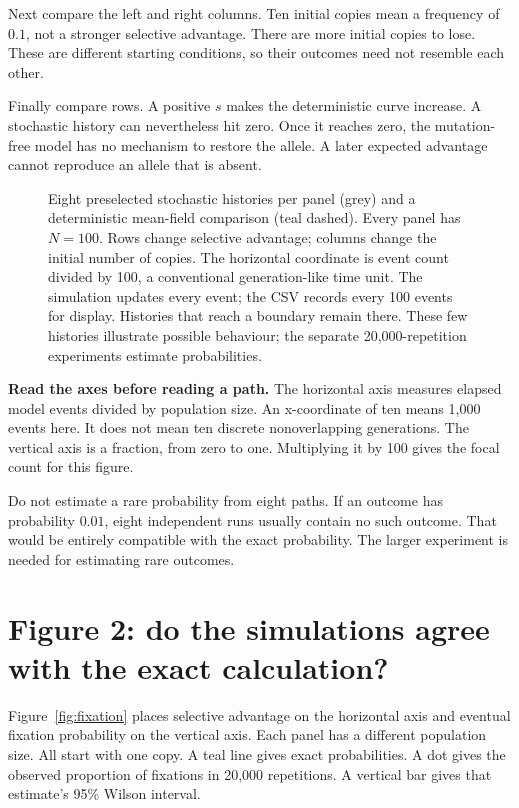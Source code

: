Next compare the left and right columns. Ten initial copies mean a frequency of \(0.1\), not a stronger selective advantage. There are more initial copies to lose. These are different starting conditions, so their outcomes need not resemble each other.

Finally compare rows. A positive \(s\) makes the deterministic curve increase. A stochastic history can nevertheless hit zero. Once it reaches zero, the mutation-free model has no mechanism to restore the allele. A later expected advantage cannot reproduce an allele that is absent.

\begin{figure}[p]
\centering

\caption{Eight preselected stochastic histories per panel (grey) and a deterministic mean-field comparison (teal dashed). Every panel has \(N=100\). Rows change selective advantage; columns change the initial number of copies. The horizontal coordinate is event count divided by 100, a conventional generation-like time unit. The simulation updates every event; the CSV records every 100 events for display. Histories that reach a boundary remain there. These few histories illustrate possible behaviour; the separate 20,000-repetition experiments estimate probabilities.}
\label{fig:trajectories}
\end{figure}
\clearpage

\textbf{Read the axes before reading a path.} The horizontal axis measures elapsed model events divided by population size. An x-coordinate of ten means 1,000 events here. It does not mean ten discrete nonoverlapping generations. The vertical axis is a fraction, from zero to one. Multiplying it by 100 gives the focal count for this figure.

Do not estimate a rare probability from eight paths. If an outcome has probability \(0.01\), eight independent runs usually contain no such outcome. That would be entirely compatible with the exact probability. The larger experiment is needed for estimating rare outcomes.

\section{Figure 2: do the simulations agree with the exact calculation?}
Figure~\ref{fig:fixation} places selective advantage on the horizontal axis and eventual fixation probability on the vertical axis. Each panel has a different population size. All start with one copy. A teal line gives exact probabilities. A dot gives the observed proportion of fixations in 20,000 repetitions. A vertical bar gives that estimate's 95\% Wilson interval.

